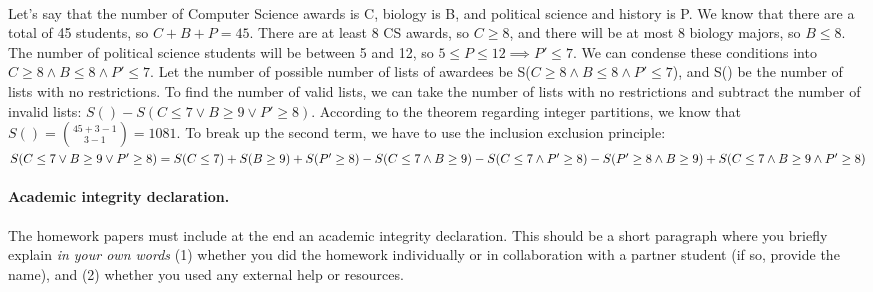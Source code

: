 \documentclass[11pt]{article}
\begin{document}
\begin{solution}
   \\
	Let's say that the number of Computer Science awards is C,  biology is B, and political science and history is P. We know that there are a total of 45 students, so $C + B + P = 45$. There are at least 8 CS awards, so $C \geq 8$, and there will be at most 8 biology majors, so $B \leq 8$. The number of political science students will be between 5 and 12, so $5 \leq P \leq 12 \implies P' \leq 7$. We can condense these conditions into $C \geq 8 \land B \leq 8 \land P' \leq 7$. Let the number of possible number of lists of awardees be S($C \geq 8 \land B \leq 8 \land P' \leq 7$), and S() be the number of lists with no restrictions. To find the number of valid lists, we can take the number of lists with no restrictions and subtract the number of invalid lists: $S() - S(C \leq 7 \lor B \geq 9 \lor P' \geq 8)$. According to the theorem regarding integer partitions, we know that $S() = {45 + 3 - 1 \choose 3 - 1} = 1081$. To break up the second term, we have to use the inclusion exclusion principle: 
   \\
   $
   S(C \leq 7 \lor B \geq 9 \lor P' \geq 8) = 
   \\
   S(C\leq7) + S(B\geq9) + S(P'\geq8) - S(C\leq7 \land B\geq9) - S(C\leq7 \land  P'\geq 8)
   \\ 
   - S(P'\geq 8 \land B\geq9) + S(C \leq 7 \land B \geq 9 \land P' \geq 8)
   $

\end{solution}


\newpage
\paragraph{Academic integrity declaration.}
The homework papers must include at the end an academic integrity declaration. This should be a short paragraph where you briefly explain 
\emph{in your own words}  (1) whether you did the homework individually or in collaboration with a partner student (if so, provide the name), 
and (2) whether you used any external help or resources. 

\end{document}
